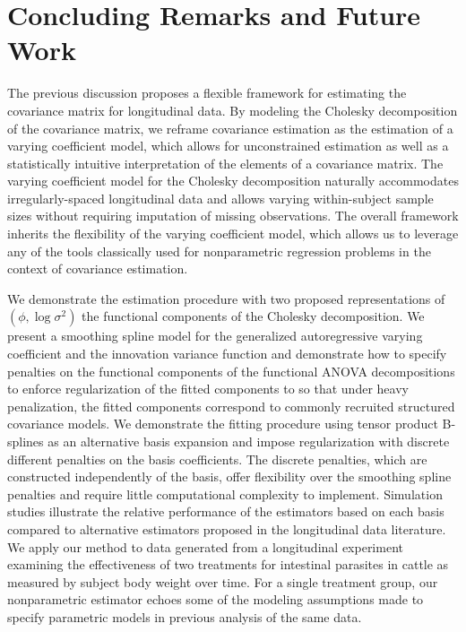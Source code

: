 
\chapter{Concluding Remarks and Future Work}\label{concluding-remarks-chapter}




The previous discussion proposes a flexible framework for estimating the covariance matrix for longitudinal data. By modeling the Cholesky decomposition of the covariance matrix, we reframe covariance estimation as the estimation of a varying coefficient model, which allows for unconstrained estimation as well as a statistically intuitive interpretation of the elements of a covariance matrix. The varying coefficient model for the Cholesky decomposition naturally accommodates irregularly-spaced longitudinal data and allows varying within-subject sample sizes without requiring imputation of missing observations. The overall framework inherits the flexibility of the varying coefficient model, which allows us to leverage any of the tools classically used for nonparametric regression problems in the context of covariance estimation.

\bigskip
We demonstrate the estimation procedure with two proposed representations of $\left(\phi, \log\sigma^2\right)$ the functional components of the Cholesky decomposition. We present a smoothing spline model for the generalized autoregressive varying coefficient and the innovation variance function and demonstrate how to specify penalties on the functional components of the functional ANOVA decompositions to enforce regularization of the fitted components to so that under heavy penalization, the fitted components correspond to commonly recruited structured covariance models. We demonstrate the fitting procedure using tensor product B-splines as an alternative basis expansion and impose regularization with discrete different penalties on the basis coefficients. The discrete penalties, which are constructed independently of the basis, offer flexibility over the smoothing spline penalties and require little computational complexity to implement. Simulation studies illustrate the relative performance of the estimators based on each basis compared to alternative estimators proposed in the longitudinal data literature. We apply our method to data generated from a longitudinal experiment examining the effectiveness of two treatments for intestinal parasites in cattle as measured by subject body weight over time. For a single treatment group, our nonparametric estimator echoes some of the modeling assumptions made to specify parametric models in previous analysis of the same data.

